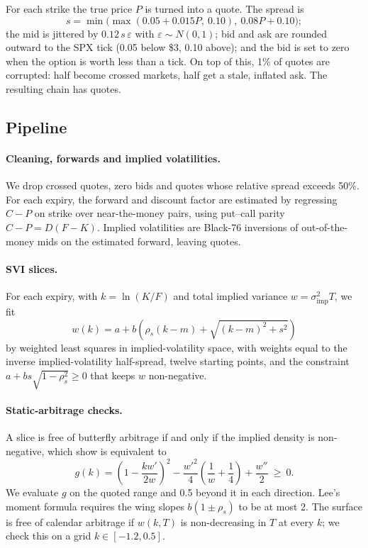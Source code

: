 \documentclass[11pt]{article}
\theoremstyle{remark}
\begin{document}
For each strike the true price $P$ is turned into a quote.
The spread is
\[
  s = \min\!\big(\max(0.05 + 0.015P,\ 0.10),\ 0.08P + 0.10\big);
\]
the mid is jittered by $0.12\,s\,\varepsilon$ with $\varepsilon \sim N(0,1)$; bid and ask are rounded outward to the SPX tick (0.05 below \$3, 0.10 above); and the bid is set to zero when the option is worth less than a tick.
On top of this, 1\% of quotes are corrupted: half become crossed markets, half get a stale, inflated ask.
The resulting chain has \NRaw{} quotes.

\subsection{Pipeline}

\paragraph{Cleaning, forwards and implied volatilities.}
We drop \NCrossed{} crossed quotes, \NZeroBid{} zero bids and \NWide{} quotes whose relative spread exceeds 50\%.
For each expiry, the forward and discount factor are estimated by regressing $C - P$ on strike over near-the-money pairs, using put--call parity $C - P = D(F - K)$.
Implied volatilities are Black-76 inversions of out-of-the-money mids on the estimated forward, leaving \NIV{} quotes.

\paragraph{SVI slices.}
For each expiry, with $k = \ln(K/F)$ and total implied variance $w = \sigma_{\mathrm{imp}}^2 T$, we fit
\begin{equation}
  w(k) = a + b\left(\rho_s (k - m) + \sqrt{(k-m)^2 + s^2}\right)
\end{equation}
by weighted least squares in implied-volatility space, with weights equal to the inverse implied-volatility half-spread, twelve starting points, and the constraint $a + bs\sqrt{1-\rho_s^2} \ge 0$ that keeps $w$ non-negative.

\paragraph{Static-arbitrage checks.}
A slice is free of butterfly arbitrage if and only if the implied density is non-negative, which \citet{gatheraljacquier2014} show is equivalent to
\begin{equation}
  g(k) = \left(1 - \frac{k w'}{2w}\right)^2 - \frac{w'^2}{4}\left(\frac{1}{w} + \frac14\right) + \frac{w''}{2} \ \ge\ 0 .
\end{equation}
We evaluate $g$ on the quoted range and 0.5 beyond it in each direction.
Lee's moment formula requires the wing slopes $b(1 \pm \rho_s)$ to be at most 2.
The surface is free of calendar arbitrage if $w(k, T)$ is non-decreasing in $T$ at every $k$; we check this on a grid $k \in [-1.2, 0.5]$.
\end{document}
